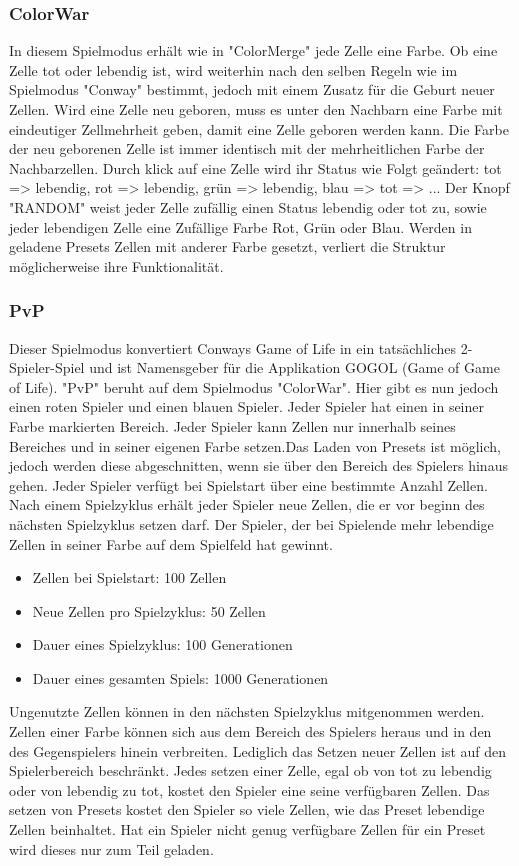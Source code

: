 \documentclass[12pt]{article}
\theoremstyle{plain}
\begin{document}
\subsubsection{ColorWar}
In diesem Spielmodus erhält wie in "ColorMerge" jede Zelle eine Farbe. Ob eine Zelle tot oder lebendig ist, wird weiterhin nach den selben Regeln wie im Spielmodus "Conway" bestimmt, jedoch mit einem Zusatz für die Geburt neuer Zellen. Wird eine Zelle neu geboren, muss es unter den Nachbarn eine Farbe mit eindeutiger Zellmehrheit geben, damit eine Zelle geboren werden kann. Die Farbe der neu geborenen Zelle ist immer identisch mit der mehrheitlichen Farbe der Nachbarzellen.
\newline
Durch klick auf eine Zelle wird ihr Status wie Folgt geändert:
\newline
tot => lebendig, rot => lebendig, grün => lebendig, blau => tot => ...
\newline
Der Knopf "RANDOM" weist jeder Zelle zufällig einen Status lebendig oder tot zu, sowie jeder lebendigen Zelle eine Zufällige Farbe Rot, Grün oder Blau. Werden in geladene Presets Zellen mit anderer Farbe gesetzt, verliert die Struktur möglicherweise ihre Funktionalität.

\subsubsection{PvP}
Dieser Spielmodus konvertiert Conways Game of Life in ein tatsächliches 2-Spieler-Spiel und ist Namensgeber für die Applikation GOGOL (Game of Game of Life). "PvP" beruht auf dem Spielmodus "ColorWar". Hier gibt es nun jedoch einen roten Spieler und einen blauen Spieler. Jeder Spieler hat einen in seiner Farbe markierten Bereich. Jeder Spieler kann Zellen nur innerhalb seines Bereiches und in seiner eigenen Farbe setzen.Das Laden von Presets ist möglich, jedoch werden diese abgeschnitten, wenn sie über den Bereich des Spielers hinaus gehen. Jeder Spieler verfügt bei Spielstart über eine bestimmte Anzahl Zellen. Nach einem Spielzyklus erhält jeder Spieler neue Zellen, die er vor beginn des nächsten Spielzyklus setzen darf. Der Spieler, der bei Spielende mehr lebendige Zellen in seiner Farbe auf dem Spielfeld hat gewinnt.
\begin{itemize}
\item
Zellen bei Spielstart: 100 Zellen
\item
Neue Zellen pro Spielzyklus: 50 Zellen
\item
Dauer eines Spielzyklus: 100 Generationen
\item
Dauer eines gesamten Spiels: 1000 Generationen
\end{itemize}
Ungenutzte Zellen können in den nächsten Spielzyklus mitgenommen werden. Zellen einer Farbe können sich aus dem Bereich des Spielers heraus und in den des Gegenspielers hinein verbreiten. Lediglich das Setzen neuer Zellen ist auf den Spielerbereich beschränkt. Jedes setzen einer Zelle, egal ob von tot zu lebendig oder von lebendig zu tot, kostet den Spieler eine seine verfügbaren Zellen. Das setzen von Presets kostet den Spieler so viele Zellen, wie das Preset lebendige Zellen beinhaltet. Hat ein Spieler nicht genug verfügbare Zellen für ein Preset wird dieses nur zum Teil geladen.
\end{document}

